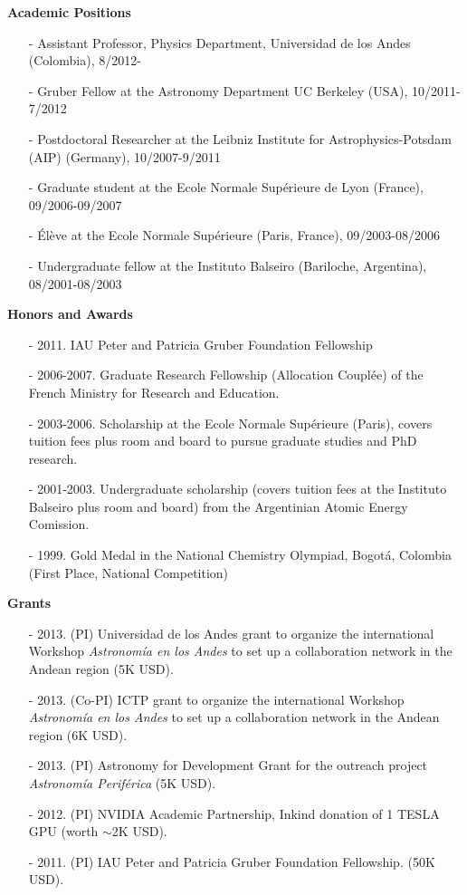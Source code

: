 \documentclass[9pt]{article}
\begin{document}
{\bf Academic Positions}
\begin{itemize}
\item[-] Assistant Professor, Physics Department, Universidad de los Andes (Colombia), 8/2012-
\item[-] Gruber Fellow at the Astronomy Department UC Berkeley (USA), 10/2011-7/2012
\item[-] Postdoctoral Researcher at the Leibniz Institute for
  Astrophysics-Potsdam (AIP) (Germany), 10/2007-9/2011  
\item[-] Graduate student at the Ecole Normale Sup\'erieure de Lyon
  (France), 09/2006-09/2007  
\item[-] \'El\`eve at the Ecole Normale Sup\'erieure (Paris, France),
  09/2003-08/2006 
\item[-] Undergraduate fellow at the Instituto Balseiro (Bariloche,
  Argentina), 08/2001-08/2003 
\end{itemize}

\newpage
{\bf Honors and Awards}
\begin{itemize}
\item[-] 2011. IAU Peter and Patricia Gruber Foundation Fellowship
\item[-] 2006-2007. Graduate Research Fellowship (Allocation Coupl\'ee) of the French
  Ministry for Research and Education.
\item[-] 2003-2006. Scholarship at the Ecole Normale Sup\'erieure (Paris), covers tuition fees plus room and
  board to pursue graduate studies and PhD research.
\item[-] 2001-2003. Undergraduate scholarship (covers tuition fees at the
  Instituto Balseiro plus room and board) from the Argentinian Atomic Energy
  Comission.
\item[-] 1999. Gold Medal in the National Chemistry Olympiad, Bogot\'a,
  Colombia (First Place, National Competition)
\end{itemize}

{\bf Grants}
\begin{itemize}
\item[-] 2013. (PI) Universidad de los Andes grant to organize the
  international Workshop \emph{Astronom\'ia en los Andes} to set up a
  collaboration network in the Andean region (5K USD). 
\item[-] 2013. (Co-PI) ICTP grant to organize the international
  Workshop \emph{Astronom\'ia en los Andes} to set up a collaboration
  network in the Andean region (6K USD). 
\item[-] 2013. (PI) Astronomy for Development Grant for the outreach
  project \emph{Astronom\'ia Perif\'erica} (5K USD). 
\item[-] 2012. (PI) NVIDIA Academic Partnership, Inkind donation of 1
  TESLA GPU (worth $\sim$2K USD). 
\item[-] 2011. (PI) IAU Peter and Patricia Gruber Foundation
  Fellowship. (50K USD).
\end{itemize}
\end{document}
